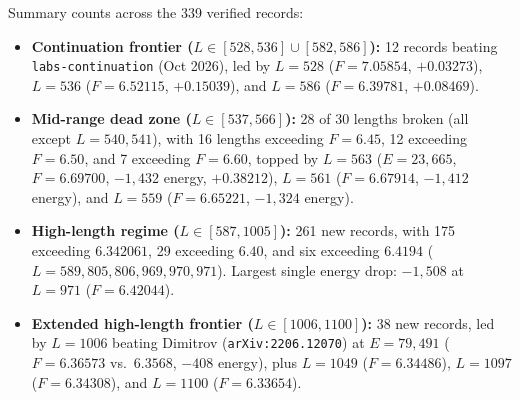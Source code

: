 \documentclass[10.5pt,letterpaper]{article}
\begin{document}
Summary counts across the 339 verified records:
\begin{itemize}
\item \textbf{Continuation frontier ($L \in [528, 536] \cup [582, 586]$):} 12 records beating \texttt{labs-continuation} (Oct 2026), led by $L = 528$ ($F = 7.05854$, $+0.03273$), $L = 536$ ($F = 6.52115$, $+0.15039$), and $L = 586$ ($F = 6.39781$, $+0.08469$).
\item \textbf{Mid-range dead zone ($L \in [537, 566]$):} 28 of 30 lengths broken (all except $L = 540, 541$), with 16 lengths exceeding $F = 6.45$, 12 exceeding $F = 6.50$, and 7 exceeding $F = 6.60$, topped by $L = 563$ ($E = 23{,}665$, $F = 6.69700$, $-1{,}432$ energy, $+0.38212$), $L = 561$ ($F = 6.67914$, $-1{,}412$ energy), and $L = 559$ ($F = 6.65221$, $-1{,}324$ energy).
\item \textbf{High-length regime ($L \in [587, 1005]$):} 261 new records, with 175 exceeding $6.342061$, 29 exceeding $6.40$, and six exceeding $6.4194$ ($L = 589, 805, 806, 969, 970, 971$). Largest single energy drop: $-1{,}508$ at $L = 971$ ($F = 6.42044$).
\item \textbf{Extended high-length frontier ($L \in [1006, 1100]$):} 38 new records, led by $L = 1006$ beating Dimitrov (\texttt{arXiv:2206.12070}) at $E = 79{,}491$ ($F = 6.36573$ vs.\ $6.3568$, $-408$ energy), plus $L = 1049$ ($F = 6.34486$), $L = 1097$ ($F = 6.34308$), and $L = 1100$ ($F = 6.33654$).
\end{itemize}
\end{document}
